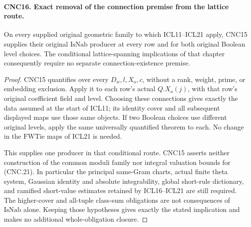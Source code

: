 \paragraph{CNC16. Exact removal of the connection premise from the lattice route.}
\label{claim:CNC16}
On every supplied original geometric family to which ICL11--ICL21
apply, CNC15 supplies their original \(\mathrm{IsNab}\) producer
at every row and for both original Boolean level choices.  The
conditional lattice-spanning implications of that chapter consequently
require no separate connection-existence premise.
\begin{proof}
CNC15 quantifies over every \(D_w,l,X_o,c\), without a rank,
weight, prime, or embedding exclusion.  Apply it to each row's actual
\(Q.X_o(j)\), with that row's original coefficient field and level.
Choosing these connections gives exactly the data assumed at the start
of ICL11; its identity cover and all subsequent displayed maps use those
same objects.  If two Boolean choices use different original levels,
apply the same universally quantified theorem to each.  No change in
the \(\mathrm{FWTie}\) maps of ICL21 is needed.

This supplies one producer in that conditional route.  CNC15 asserts
neither construction of the common moduli family nor integral
valuation bounds for (CNC.21).  In particular the principal
same-Gram charts, actual finite theta system, Gaussian identity and
absolute integrability, global short-rule dictionary, and ramified
short-value estimates retained by ICL16--ICL21 are still required.
The higher-cover and all-tuple class-sum obligations are not consequences
of \(\mathrm{IsNab}\) alone.  Keeping those hypotheses gives exactly
the stated implication and makes no additional whole-obligation closure.
\end{proof}
